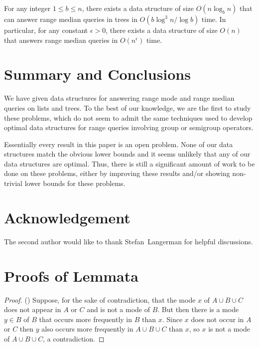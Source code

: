\documentclass{njcarticle}
\begin{document}
\begin{theorem}
For any integer $1 \leq b \leq n$, there exists a data structure of
size $O(n \log_b n)$ that can answer range median queries in trees in
$O(b \log^3 n / \log b)$ time.  In particular, for any constant
$\epsilon>0$, there exists a data structure of size $O(n)$ that
answers range median queries in $O(n^{\epsilon})$ time.
\end{theorem}


\section{Summary and Conclusions}

We have given data structures for answering range mode and
range median queries on lists and trees.  To the best of our
knowledge, we are the first to study these problems, which
do not seem to admit the same techniques used to develop optimal data
structures for range queries involving group or semigroup operators. 

Essentially every result in this paper is an open problem. None of our
data structures match the obvious lower bounds and it seems unlikely
that any of our data structures are optimal.  Thus, there is still a
significant amount of work to be done on these problems, either by
improving these results and/or showing non-trivial lower bounds for
these problems.

\section*{Acknowledgement}

The second author would like to thank Stefan~Langerman for helpful discussions.

\appendix
\section{Proofs of Lemmata}

\begin{proof}()
Suppose, for the sake of contradiction, that the mode $x$ of $A\cup B\cup C$
does not appear in $A$ or $C$ and is not a mode of $B$.  But then there is
a mode $y\in B$ of $B$ that occurs more frequently in $B$ than $x$.  Since
$x$ does not occur in $A$ or $C$ then $y$ also occurs more frequently in $A\cup
B\cup C$ than $x$, so $x$ is not a mode of $A\cup B\cup C$, a contradiction.
\end{proof}
\end{document}
